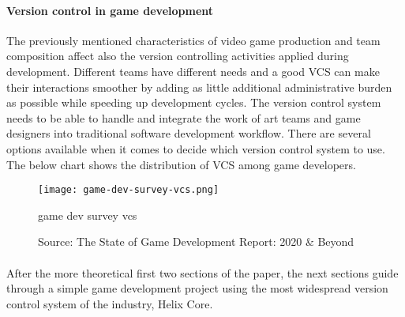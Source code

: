 \paragraph{Version control in game development}
The previously mentioned characteristics of video game production and team composition affect also the version controlling 
activities applied during development. Different teams have different needs and a good VCS can make their interactions smoother 
by adding as little additional administrative burden as possible while speeding up development cycles. The version control
system needs to be able to handle and integrate the work of art teams and game designers into traditional software development
workflow.
There are several options available when it comes to decide which version control system to use. The below chart shows 
the distribution of VCS among game developers.
\begin{figure}[H]
    \centering
    \texttt{[image: game-dev-survey-vcs.png]}
    \caption{game dev survey vcs}
    \caption*{Source: The State of Game Development Report: 2020 $\&$ Beyond \protect\cite{game-dev-report-2020}}
    \label{fig:game-dev-survey-vcs}
\end{figure}

\paragraph{}
After the more theoretical first two sections of the paper, the next sections guide through a simple game development
project using the most widespread version control system of the industry, 
Helix Core\textsuperscript{\texttrademark}.